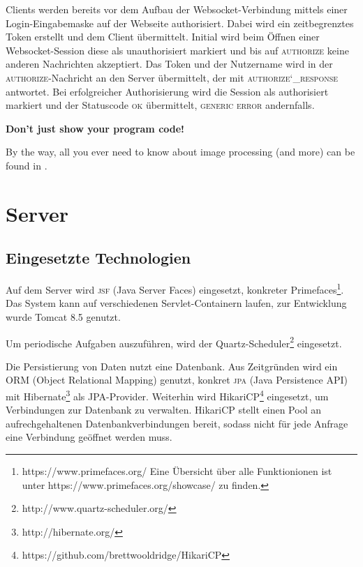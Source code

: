 \documentclass[ngerman,11pt]{report}
\begin{document}
Clients werden bereits vor dem Aufbau der Websocket-Verbindung mittels einer Login-Eingabemaske
auf der Webseite authorisiert. Dabei wird ein zeitbegrenztes Token erstellt und dem Client
übermittelt. Initial wird beim Öffnen einer Websocket-Session diese als unauthorisiert markiert
und bis auf \textsc{authorize} keine anderen Nachrichten akzeptiert. Das Token und der Nutzername wird in
der \textsc{authorize}-Nachricht an den Server übermittelt, der mit \textsc{authorize\char`_response} antwortet.
Bei erfolgreicher Authorisierung wird die Session als authorisiert markiert und der Statuscode \textsc{ok}
übermittelt, \textsc{generic error} andernfalls.

\begin{center}
\textbf{Don't just show your program code!} 
\end{center}

By the way, all you ever need to know about image processing (and more) can be 
found in \cite{BurgerBurge08}.%

\chapter{Server}

\section{Eingesetzte Technologien}

Auf dem Server wird \textsc{jsf} (Java Server Faces) eingesetzt, konkreter
Primefaces\footnote{https://www.primefaces.org/ Eine Übersicht über alle
Funktionionen ist unter https://www.primefaces.org/showcase/ zu finden.}.
Das System kann auf verschiedenen Servlet-Containern laufen, zur Entwicklung
wurde Tomcat 8.5 genutzt.

Um periodische Aufgaben auszuführen, wird der
Quartz-Scheduler\footnote{http://www.quartz-scheduler.org/} eingesetzt.

Die Persistierung von Daten nutzt eine Datenbank. Aus Zeitgründen wird ein ORM
(Object Relational Mapping) genutzt, konkret \textsc{jpa} (Java Persistence API)
mit Hibernate\footnote{http://hibernate.org/} als JPA-Provider. Weiterhin wird
HikariCP\footnote{https://github.com/brettwooldridge/HikariCP} eingesetzt, um
Verbindungen zur Datenbank zu verwalten. HikariCP stellt einen Pool an
aufrechgehaltenen Datenbankverbindungen bereit, sodass nicht für jede Anfrage
eine Verbindung geöffnet werden muss.
\end{document}

